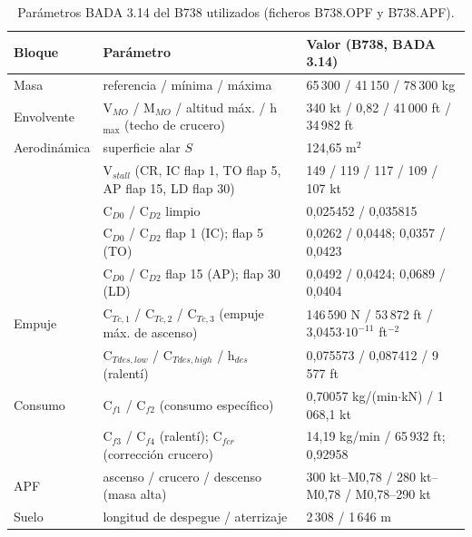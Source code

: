 \documentclass[11pt,a4paper]{article}
\DeclareRobustCommand{\m}[1]{{\ttfamily\def\_{\textunderscore\penalty100\relax}#1}}
\begin{document}
\begin{table}[H]\centering\footnotesize
\begin{tabularx}{\linewidth}{lYl}\toprule
Bloque & Parámetro & Valor (B738, BADA 3.14)\\ \midrule
Masa & referencia / mínima / máxima & 65\,300 / 41\,150 / 78\,300 kg\\
Envolvente & V$_{MO}$ / M$_{MO}$ / altitud máx. / h$_{\max}$ (techo de crucero) & 340 kt / 0,82 / 41\,000 ft / 34\,982 ft\\
Aerodinámica & superficie alar $S$ & 124,65 m$^2$\\
 & V$_{stall}$ (CR, IC flap 1, TO flap 5, AP flap 15, LD flap 30) & 149 / 119 / 117 / 109 / 107 kt\\
 & C$_{D0}$ / C$_{D2}$ limpio & 0,025452 / 0,035815\\
 & C$_{D0}$ / C$_{D2}$ flap 1 (IC); flap 5 (TO) & 0,0262 / 0,0448; 0,0357 / 0,0423\\
 & C$_{D0}$ / C$_{D2}$ flap 15 (AP); flap 30 (LD) & 0,0492 / 0,0424; 0,0689 / 0,0404\\
Empuje & C$_{Tc,1}$ / C$_{Tc,2}$ / C$_{Tc,3}$ (empuje máx. de ascenso) & 146\,590 N / 53\,872 ft / 3,0453$\cdot10^{-11}$ ft$^{-2}$\\
 & C$_{Tdes,low}$ / C$_{Tdes,high}$ / h$_{des}$ (ralentí) & 0,075573 / 0,087412 / 9\,577 ft\\
Consumo & C$_{f1}$ / C$_{f2}$ (consumo específico) & 0,70057 kg/(min$\cdot$kN) / 1\,068,1 kt\\
 & C$_{f3}$ / C$_{f4}$ (ralentí); C$_{fcr}$ (corrección crucero) & 14,19 kg/min / 65\,932 ft; 0,92958\\
APF & ascenso / crucero / descenso (masa alta) & 300 kt--M0,78 / 280 kt--M0,78 / M0,78--290 kt\\
Suelo & longitud de despegue / aterrizaje & 2\,308 / 1\,646 m\\ \bottomrule
\end{tabularx}
\caption{Parámetros BADA 3.14 del B738 utilizados (ficheros \m{B738\_\_.OPF} y \m{B738\_\_.APF}).}
\label{tab:bada}
\end{table}
\end{document}
